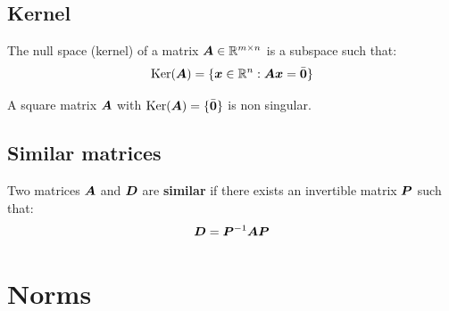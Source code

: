 \subsection{Kernel}
The null space (kernel) of a matrix ${\bm{A}} \in \mathbb{R}^{m \times n}$ is a subspace such that: 
\begin{equation*}
    \text{Ker}({\bm{A}}) = \{ {\bm{x}} \in \mathbb{R}^n : {\bm{A}}{\bm{x}} = \bar{{\bm{0}}} \}
\end{equation*}
%
\begin{theorem} \label{th:kernel_invertible}
    A square matrix ${\bm{A}}$ with $\text{\normalfont Ker}({\bm{A}}) = \{\bar{{\bm{0}}}\}$ is non singular.
\end{theorem}

\subsection{Similar matrices} 
Two matrices ${\bm{A}}$ and ${\bm{D}}$ are \textbf{similar} if there exists an invertible matrix ${\bm{P}}$ such that:
\[ {\bm{D}} = {\bm{P}}^{-1} {\bm{A}} {\bm{P}} \]



\section{Norms}

